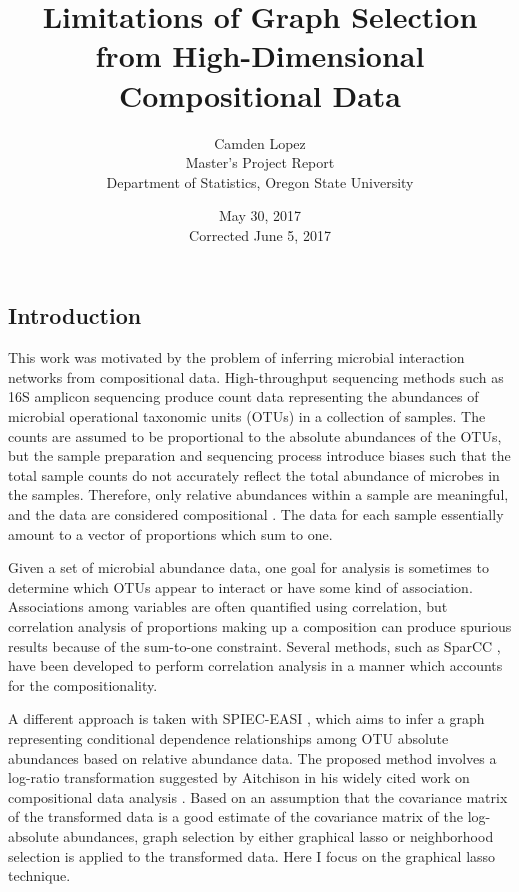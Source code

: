 \documentclass[12pt]{article}
\title{Limitations of Graph Selection from High-Dimensional Compositional Data}
\author{Camden Lopez \\ Master's Project Report \\ Department of Statistics, Oregon State University}
\date{May 30, 2017 \\ Corrected June 5, 2017}
\begin{document}
\maketitle

\clearpage
\setcounter{page}{1}

\subsection*{Introduction}

This work was motivated by the problem of inferring microbial interaction networks from compositional data. High-throughput sequencing methods such as 16S amplicon sequencing produce count data representing the abundances of microbial operational taxonomic units (OTUs) in a collection of samples. The counts are assumed to be proportional to the absolute abundances of the OTUs, but the sample preparation and sequencing process introduce biases such that the total sample counts do not accurately reflect the total abundance of microbes in the samples. Therefore, only relative abundances within a sample are meaningful, and the data are considered compositional \cite{gloor,tsilimigras}. The data for each sample essentially amount to a vector of proportions which sum to one.

Given a set of microbial abundance data, one goal for analysis is sometimes to determine which OTUs appear to interact or have some kind of association. Associations among variables are often quantified using correlation, but correlation analysis of proportions making up a composition can produce spurious results because of the sum-to-one constraint. Several methods, such as SparCC \cite{friedmanjon}, have been developed to perform correlation analysis in a manner which accounts for the compositionality.

A different approach is taken with SPIEC-EASI \cite{kurtz}, which aims to infer a graph representing conditional dependence relationships among OTU absolute abundances based on relative abundance data. The proposed method involves a log-ratio transformation suggested by Aitchison in his widely cited work on compositional data analysis \citeyear{aitchison}. Based on an assumption that the covariance matrix of the transformed data is a good estimate of the covariance matrix of the log-absolute abundances, graph selection by either graphical lasso or neighborhood selection is applied to the transformed data. Here I focus on the graphical lasso technique.
\end{document}
